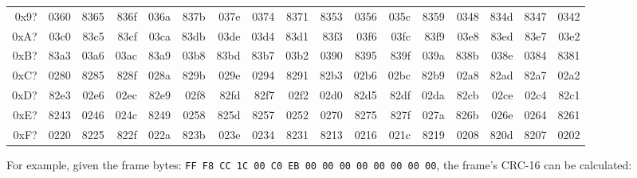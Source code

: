\begin{table}[h]
{\begin{tabular}{|r||r|r|r|r|r|r|r|r|r|r|r|r|r|r|r|r|}
0x9? & 0360 & 8365 & 836f & 036a & 837b & 037e & 0374 & 8371 & 8353 & 0356 & 035c & 8359 & 0348 & 834d & 8347 & 0342 \\
0xA? & 03c0 & 83c5 & 83cf & 03ca & 83db & 03de & 03d4 & 83d1 & 83f3 & 03f6 & 03fc & 83f9 & 03e8 & 83ed & 83e7 & 03e2 \\
0xB? & 83a3 & 03a6 & 03ac & 83a9 & 03b8 & 83bd & 83b7 & 03b2 & 0390 & 8395 & 839f & 039a & 838b & 038e & 0384 & 8381 \\
0xC? & 0280 & 8285 & 828f & 028a & 829b & 029e & 0294 & 8291 & 82b3 & 02b6 & 02bc & 82b9 & 02a8 & 82ad & 82a7 & 02a2 \\
0xD? & 82e3 & 02e6 & 02ec & 82e9 & 02f8 & 82fd & 82f7 & 02f2 & 02d0 & 82d5 & 82df & 02da & 82cb & 02ce & 02c4 & 82c1 \\
0xE? & 8243 & 0246 & 024c & 8249 & 0258 & 825d & 8257 & 0252 & 0270 & 8275 & 827f & 027a & 826b & 026e & 0264 & 8261 \\
0xF? & 0220 & 8225 & 822f & 022a & 823b & 023e & 0234 & 8231 & 8213 & 0216 & 021c & 8219 & 0208 & 820d & 8207 & 0202 \\
\hline
\end{tabular}
}
\end{table}
\par
\noindent
For example, given the frame bytes:
\texttt{FF F8 CC 1C 00 C0 EB 00 00 00 00 00 00 00 00},
the frame's CRC-16 can be calculated:
